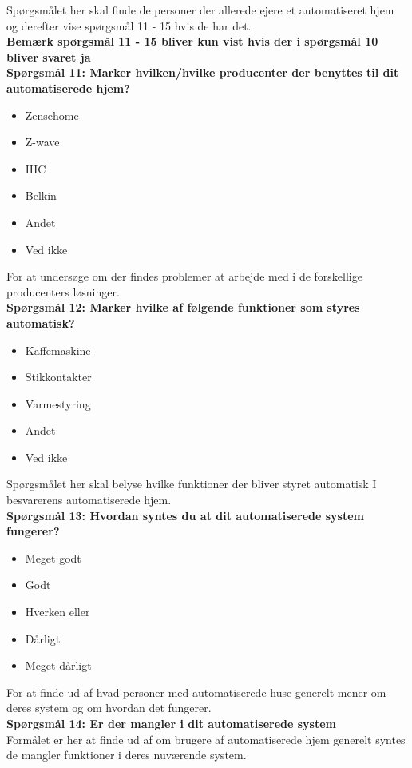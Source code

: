 Spørgsmålet her skal finde de personer der allerede ejere et automatiseret hjem og derefter vise spørgsmål 11 - 15 hvis de har det.\\

{\bf{Bemærk spørgsmål 11 - 15 bliver kun vist hvis der i spørgsmål 10 bliver svaret ja}}\\
{\bf{Spørgsmål 11: Marker hvilken/hvilke producenter der benyttes til dit automatiserede hjem?}}
\begin{itemize}
    \item Zensehome
    \item Z-wave
    \item IHC
    \item Belkin
    \item Andet
    \item Ved ikke
\end{itemize}

For at undersøge om der findes problemer at arbejde med i de forskellige producenters løsninger.\\

{\bf{Spørgsmål 12: Marker hvilke af følgende funktioner som styres automatisk?}}
\begin{itemize}
    \item Kaffemaskine
    \item Stikkontakter
    \item Varmestyring
    \item Andet
    \item Ved ikke
\end{itemize}

Spørgsmålet her skal belyse hvilke funktioner der bliver styret automatisk I besvarerens automatiserede hjem.\\

{\bf{Spørgsmål 13: Hvordan syntes du at dit automatiserede system fungerer?}}
\begin{itemize}
    \item Meget godt
    \item Godt
    \item Hverken eller
    \item Dårligt
    \item Meget dårligt
\end{itemize}

For at finde ud af hvad personer med automatiserede huse generelt mener om deres system og om hvordan det fungerer.\\

{\bf{Spørgsmål 14: Er der mangler i dit automatiserede system}}\\
Formålet er her at finde ud af om brugere af automatiserede hjem generelt syntes de mangler funktioner i deres nuværende system.\\

